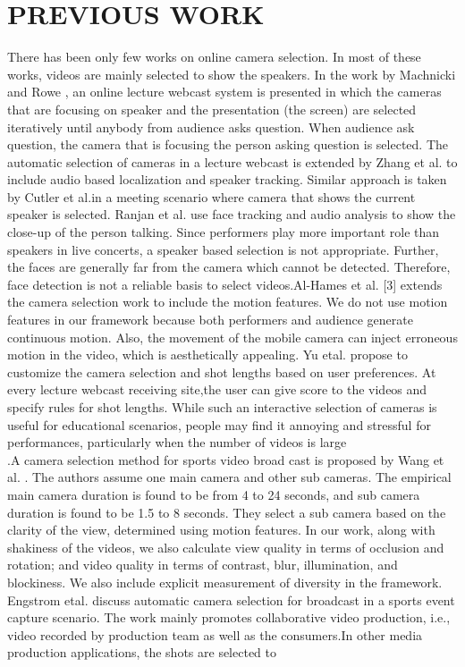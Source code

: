 \documentclass{IEEEtran}
\begin{document}
\section{PREVIOUS WORK}
There has been only few works on online camera selection. In most of these works, videos are mainly selected to show the speakers. In the work by Machnicki and Rowe \cite{web:9}, an online lecture
webcast system is presented in which the cameras that are focusing on speaker and the presentation (the screen) are selected iteratively until anybody from audience asks question. When audience ask question, the camera that is focusing the person asking question is selected. The automatic selection of cameras in a lecture webcast is extended by Zhang et al. \cite{web:3} to include audio based localization and speaker tracking. Similar approach is taken by Cutler et al.in a meeting scenario where camera that shows the current speaker is selected. Ranjan et al. \cite{web:12} use face tracking and audio analysis to show the close-up of the person talking. Since performers play more important role than speakers in live concerts, a speaker based selection is not appropriate. Further, the faces are generally far from the camera which cannot be detected. Therefore, face detection is not a reliable basis to select videos.Al-Hames et al. [3] extends the camera selection work to include the motion features. We do not use motion features in our framework because both performers and audience generate continuous motion. Also, the movement of the mobile camera can inject erroneous motion in the video, which is aesthetically appealing. Yu etal. \cite{web:20} propose to customize the camera selection and shot lengths based on user preferences. At every lecture webcast receiving site,the user can give score to the videos and specify rules for shot lengths. While such an interactive selection of cameras is useful for educational scenarios, people may find it annoying and stressful for performances, particularly when the number of videos is large\\
.A camera selection method for sports video broad cast is proposed by Wang et al. \cite{web:16}. The authors assume one main camera and other sub cameras. The empirical main camera duration is found to be from 4 to 24 seconds, and sub camera duration is found to be 1.5 to 8 seconds. They select a sub camera based on the clarity of the view, determined using motion features. In our work, along with shakiness of the videos, we also calculate view quality in terms of occlusion and rotation; and video quality in terms of contrast, blur, illumination, and blockiness. We also include explicit measurement of diversity in the framework. Engstrom etal. \cite{web:7} discuss automatic camera selection for broadcast in a sports event capture scenario. The work mainly promotes collaborative video production, i.e., video recorded by production team as well as the consumers.In other media production applications, the shots are selected to
\end{document}
